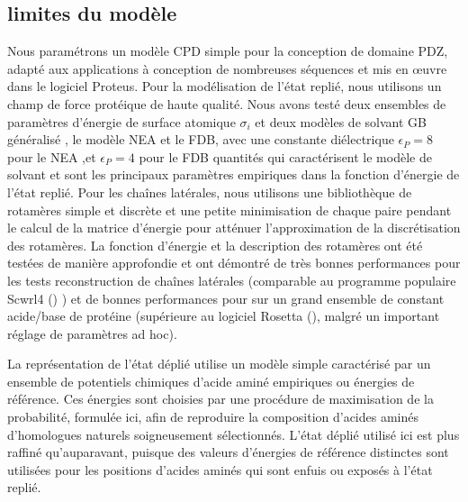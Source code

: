 \subsection{limites du modèle}

Nous paramétrons un modèle CPD simple pour la conception de domaine PDZ, adapté aux applications à conception de nombreuses séquences et mis en œuvre dans le logiciel Proteus. Pour la modélisation de l'état replié, nous utilisons un champ de force protéique de haute qualité. Nous avons testé deux ensembles de paramètres d'énergie de surface atomique $\sigma_i$ et deux modèles de solvant \og GB généralisé \fg, le modèle NEA et le FDB, avec une constante diélectrique $\epsilon_P = 8$  pour le NEA ,et $\epsilon_P = 4$ pour le FDB quantités  qui caractérisent  le modèle de solvant et sont les principaux paramètres empiriques dans la fonction d'énergie de l'état replié. Pour les chaînes latérales, nous utilisons une bibliothèque de rotamères simple et discrète et une petite minimisation de chaque paire pendant le calcul de la matrice d'énergie pour atténuer l'approximation de la discrétisation des rotamères. La fonction d'énergie et la description des rotamères ont été testées de manière approfondie et ont démontré de très bonnes performances pour les tests reconstruction de chaînes latérales \cite{Gaillard16} (comparable au programme populaire Scwrl4 (\cite{Krivov09}) ) et de bonnes performances pour sur un grand ensemble de constant acide/base de protéine \cite{Polydorides13} (supérieure au logiciel Rosetta (\cite{Kilambi12}), malgré un important réglage de paramètres ad hoc).

La représentation de l'état déplié utilise un modèle simple caractérisé par un ensemble de potentiels chimiques d'acide aminé empiriques ou énergies de référence. Ces énergies sont choisies par une procédure de maximisation de la probabilité, formulée ici, afin de reproduire la composition d'acides aminés d'homologues naturels soigneusement sélectionnés. L'état déplié utilisé ici est plus raffiné qu'auparavant, puisque des valeurs d'énergies de référence distinctes sont utilisées pour les positions d'acides aminés qui sont enfuis ou exposés à l'état replié.  

